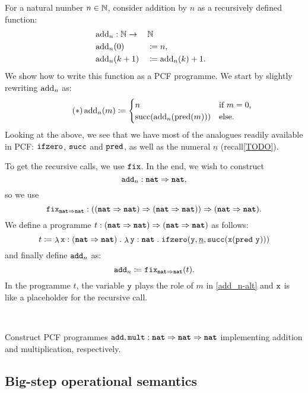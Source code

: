 \begin{example}
  For a natural number \(n \in \Nat\), consider addition by \(n\) as a
  recursively defined function:
  \begin{alignat*}{3}
    &\add_n : \Nat \to && \Nat && \\
    &\add_n(0) &&\coloneqq n, && \\
    &\add_n(k+1) &&\coloneqq \add_n(k) + 1. &&
  \end{alignat*}
  We show how to write this function as a PCF programme. We start by slightly
  rewriting \(\add_n\) as:
  \begin{equation*}\label{add_n-alt}\tag{\(\ast\)}
    \add_n(m) \coloneqq
    \begin{cases}
      n &\text{if } m = 0, \\
      \suc\pa*{\add_n(\pred(m))} &\text{else}.
    \end{cases}
  \end{equation*}
  Looking at the above, we see that we have most of the analogues readily
  available in PCF: \(\pcfifz\), \(\pcfsuc\) and \(\pcfpred\), as well as the
  numeral \(\underline n\) (recall\cref{TODO}).

  To get the recursive calls, we use \(\fix\). In the end, we wish to construct
  \[
    \pcfadd_n : \pcfnat \pcffun \pcfnat,
  \]
  so we use
  \[
    \fix_{\pcfnat \pcffun \pcfnat} : \pa*{\pa*{\pcfnat \pcffun \pcfnat}
      \pcffun \pa*{\pcfnat \pcffun \pcfnat}} \pcffun \pa{\pcfnat \pcffun \pcfnat}.
  \]
  We define a programme
  \(t : \pa*{\pcfnat \pcffun \pcfnat} \pcffun \pa*{\pcfnat \pcffun \pcfnat}\) as
  follows:
  \[
    t \coloneqq \lambdadot{\var x : \pa{\pcfnat \pcffun
        \pcfnat}}{\lambdadot{\var y : \pcfnat}%
      {\pcfifz\pa*{\var y,\numeral{n},%
          \pcfsuc\pa*{\var x\pa*{\pcfpred \, \var y }}}}}
  \]
  and finally define \(\pcfadd_n\) as:
  \[
    \pcfadd_n \coloneqq \fix_{\pcfnat \pcffun \pcfnat}(t).
  \]
  In the programme \(t\), the variable \(\var y\) plays the role of \(m\) in
  \eqref{add_n-alt} and \(\var x\) is like a placeholder for the recursive call.
\end{example}\

\begin{exercise}
  Construct PCF programmes
  \(\pcfadd,\pcffont{mult} : \pcfnat \pcffun \pcfnat \pcffun \pcfnat\)
  implementing addition and multiplication, respectively.
\end{exercise}

\subsection{Big-step operational semantics}



